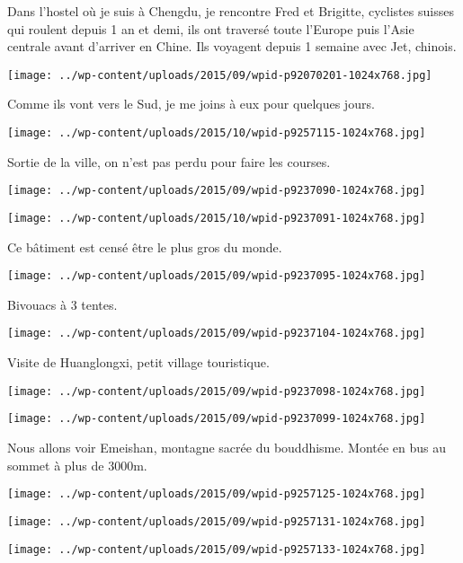 \pagebreak
 Dans l'hostel où je suis à Chengdu, je rencontre Fred et Brigitte, cyclistes suisses qui roulent depuis 1 an et demi, ils ont traversé toute l'Europe puis l'Asie centrale avant d'arriver en Chine. Ils voyagent depuis 1 semaine avec Jet, chinois. 
\begin{center} \texttt{[image: ../wp-content/uploads/2015/09/wpid-p92070201-1024x768.jpg]} \end{center}

 Comme ils vont vers le Sud, je me joins à eux pour quelques jours. 
\begin{center} \texttt{[image: ../wp-content/uploads/2015/10/wpid-p9257115-1024x768.jpg]} \end{center}

\pagebreak
 Sortie de la ville, on n'est pas perdu pour faire les courses. 
\begin{center} \texttt{[image: ../wp-content/uploads/2015/09/wpid-p9237090-1024x768.jpg]} \end{center}
\begin{center} \texttt{[image: ../wp-content/uploads/2015/10/wpid-p9237091-1024x768.jpg]} \end{center}

\pagebreak
 Ce bâtiment est censé être le plus gros du monde. 
\begin{center} \texttt{[image: ../wp-content/uploads/2015/09/wpid-p9237095-1024x768.jpg]} \end{center}

 Bivouacs à 3 tentes. 
\begin{center} \texttt{[image: ../wp-content/uploads/2015/09/wpid-p9237104-1024x768.jpg]} \end{center}

\pagebreak
 Visite de Huanglongxi, petit village touristique. 
\begin{center} \texttt{[image: ../wp-content/uploads/2015/09/wpid-p9237098-1024x768.jpg]} \end{center}
\begin{center} \texttt{[image: ../wp-content/uploads/2015/09/wpid-p9237099-1024x768.jpg]} \end{center}

\pagebreak
 Nous allons voir Emeishan, montagne sacrée du bouddhisme. Montée en bus au sommet à plus de 3000m. 
\begin{center} \texttt{[image: ../wp-content/uploads/2015/09/wpid-p9257125-1024x768.jpg]} \end{center}
\begin{center} \texttt{[image: ../wp-content/uploads/2015/09/wpid-p9257131-1024x768.jpg]} \end{center}
\begin{center} \texttt{[image: ../wp-content/uploads/2015/09/wpid-p9257133-1024x768.jpg]} \end{center}

